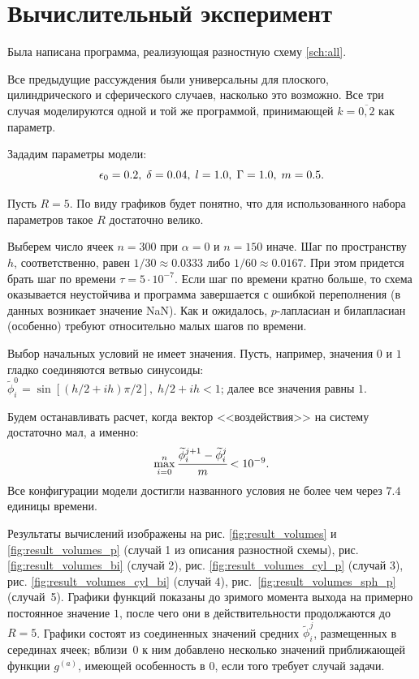 
\section{Вычислительный эксперимент}

Была написана программа, реализующая разностную схему \eqref{sch:all}.

Все предыдущие рассуждения были универсальны для плоского, цилиндрического и сферического случаев, насколько это возможно. Все три случая моделируются одной и той же программой, принимающей $k = \overline{0, 2}$ как параметр.

Зададим параметры модели:
$$\epsilon_0 = 0.2, \; \delta = 0.04, \; l = 1.0, \; \Gamma = 1.0, \; m = 0.5 {\text{.}}$$

Пусть $R = 5$. По виду графиков будет понятно, что для использованного набора параметров такое $R$ достаточно велико.

Выберем число ячеек $n = 300$ при $\alpha = 0$ и $n = 150$ иначе. Шаг по пространству~$h$, соответственно, равен $1/30 \approx 0.0333$ либо $1/60 \approx 0.0167$. При этом придется брать шаг по времени $\tau = 5 \cdot 10^{-7}$. Если шаг по времени кратно больше, то схема оказывается неустойчива и программа завершается с ошибкой переполнения (в данных возникает значение NaN). Как и ожидалось, $p$-лапласиан и билапласиан (особенно) требуют относительно малых шагов по времени.

Выбор начальных условий не имеет значения. Пусть, например, значения $0$ и $1$ гладко соединяются ветвью синусоиды: $\widetilde{\phi}_i^0 = \sin[(h/2 + ih) \pi / 2], \; h/2 + ih < 1$; далее все значения равны $1$.

Будем останавливать расчет, когда вектор <<воздействия>> на систему достаточно мал, а именно:
$$\max\limits_{i = 0}^n \cfrac{\widetilde{\phi}_i^{j + 1} - \widetilde{\phi}_i^j}{m} < 10^{-9} {\text{.}}$$
Все конфигурации модели достигли названного условия не более чем через $7.4$ единицы времени.

Результаты вычислений изображены на рис. \ref{fig:result_volumes} и \ref{fig:result_volumes_p} (случай 1 из описания разностной схемы), рис. \ref{fig:result_volumes_bi} (случай 2), рис. \ref{fig:result_volumes_cyl_p} (случай 3), рис. \ref{fig:result_volumes_cyl_bi} (случай 4), рис.~\ref{fig:result_volumes_sph_p} (случай~5). Графики функций показаны до зримого момента выхода на примерно постоянное значение $1$, после чего они в действительности продолжаются до $R = 5$. Графики состоят из соединенных значений средних $\widetilde{\phi}_i^j$, размещенных в серединах ячеек; вблизи~$0$ к ним добавлено несколько значений приближающей функции $g^{(a)}$, имеющей особенность в $0$, если того требует случай задачи.

